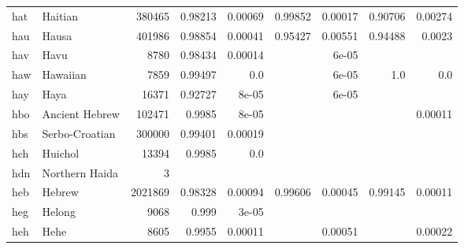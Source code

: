 \documentclass[11pt]{article}
\begin{document}
\begin{table*}[h]
{\begin{tabular}{llrrrrrrr}
hat         & Haitian         & 380465         & 0.98213         & 0.00069         & 0.99852         & 0.00017         & 0.90706         & 0.00274         \\

hau         & Hausa         & 401986         & 0.98854         & 0.00041         & 0.95427         & 0.00551         & 0.94488         & 0.0023         \\

hav         & Havu         & 8780         & 0.98434         & 0.00014         &          & 6e-05         &          &          \\

haw         & Hawaiian         & 7859         & 0.99497         & 0.0         &          & 6e-05         & 1.0         & 0.0         \\

hay         & Haya         & 16371         & 0.92727         & 8e-05         &          & 6e-05         &          &          \\

hbo         & Ancient Hebrew         & 102471         & 0.9985         & 8e-05         &          &          &          & 0.00011         \\

hbs         & Serbo-Croatian         & 300000         & 0.99401         & 0.00019         &          &          &          &          \\

hch         & Huichol         & 13394         & 0.9985         & 0.0         &          &          &          &          \\

hdn         & Northern Haida         & 3         &          &          &          &          &          &          \\

heb         & Hebrew         & 2021869         & 0.98328         & 0.00094         & 0.99606         & 0.00045         & 0.99145         & 0.00011         \\

heg         & Helong         & 9068         & 0.999         & 3e-05         &          &          &          &          \\

heh         & Hehe         & 8605         & 0.9955         & 0.00011         &          & 0.00051         &          & 0.00022         \\


\end{tabular}}
\end{table*}
\end{document}
